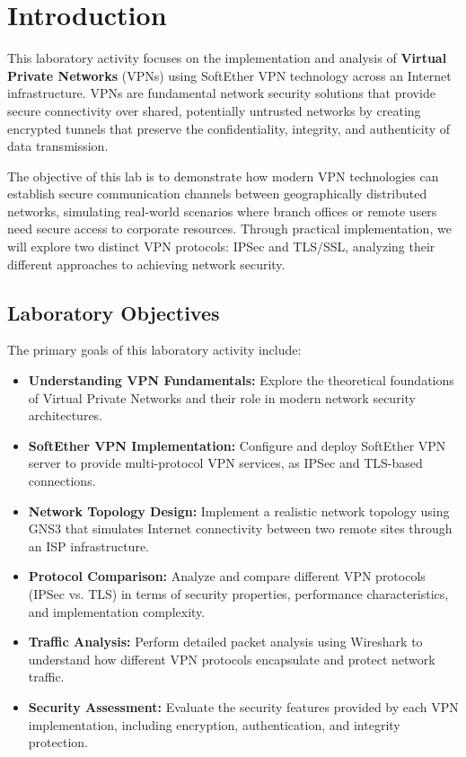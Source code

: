 \newpage

\section{Introduction}

This laboratory activity focuses on the implementation and analysis of \textbf{Virtual Private Networks} (VPNs) using SoftEther VPN technology across an Internet infrastructure. VPNs are fundamental network security solutions that provide secure connectivity over shared, potentially untrusted networks by creating encrypted tunnels that preserve the confidentiality, integrity, and authenticity of data transmission.

The objective of this lab is to demonstrate how modern VPN technologies can establish secure communication channels between geographically distributed networks, simulating real-world scenarios where branch offices or remote users need secure access to corporate resources. Through practical implementation, we will explore two distinct VPN protocols: IPSec and TLS/SSL, analyzing their different approaches to achieving network security.

\subsection{Laboratory Objectives}

The primary goals of this laboratory activity include:

\begin{itemize}
    \item \textbf{Understanding VPN Fundamentals:} Explore the theoretical foundations of Virtual Private Networks and their role in modern network security architectures.
    
    \item \textbf{SoftEther VPN Implementation:} Configure and deploy SoftEther VPN server to provide multi-protocol VPN services, as IPSec and TLS-based connections.
    
    \item \textbf{Network Topology Design:} Implement a realistic network topology using GNS3 that simulates Internet connectivity between two remote sites through an ISP infrastructure.
    
    \item \textbf{Protocol Comparison:} Analyze and compare different VPN protocols (IPSec vs. TLS) in terms of security properties, performance characteristics, and implementation complexity.
    
    \item \textbf{Traffic Analysis:} Perform detailed packet analysis using Wireshark to understand how different VPN protocols encapsulate and protect network traffic.
    
    \item \textbf{Security Assessment:} Evaluate the security features provided by each VPN implementation, including encryption, authentication, and integrity protection.
\end{itemize}

